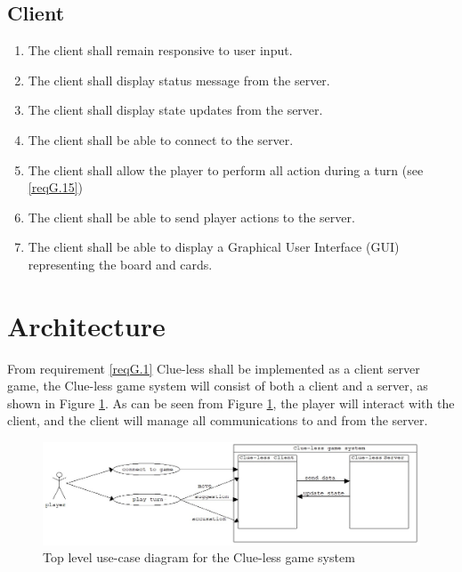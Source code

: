 \documentclass[10pt]{article}
\begin{document}
\subsection[Client]{Client} \label{clientReqs}
\begin{enumerate}[label=C.\arabic*]
\item \label{reqC.1} The client shall remain responsive to user input.
\item \label{reqC.2} The client shall display status message from the server.
\item \label{reqC.3} The client shall display state updates from the server.
\item \label{reqC.4} The client shall be able to connect to the server.
\item \label{reqC.5} The client shall allow the player to perform all action during a turn (see \ref{reqG.15})
\item \label{reqC.6} The client shall  be able to send player actions to the server.
\item \label{reqC.7} The client shall be able to display a Graphical User Interface (GUI) representing the board and cards.

\end{enumerate}

\section[Architecture]{Architecture}
From requirement \ref{reqG.1} Clue-less shall be implemented as a client server game, the Clue-less game system will consist of both a client and a server, as shown in Figure \ref{UC1}.  As can be seen from Figure \ref{UC1}, the player will interact with the client, and the client will manage all communications to and from the server.

\begin{figure}[ht]
\centering
\includegraphics[width=0.9\columnwidth]{usecase1.jpg}
\caption{\label{UC1} Top level use-case diagram for the Clue-less game system}
\end{figure}
\end{document}
